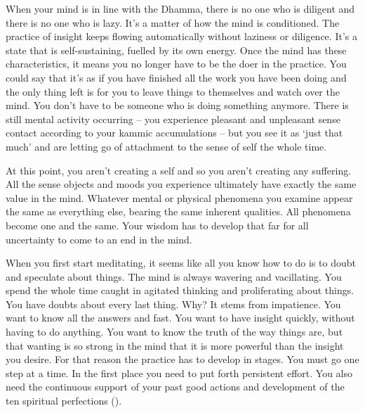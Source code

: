 When your mind is in line with the Dhamma, there is no one who is diligent and there is no one who is lazy. It's a matter of how the mind is conditioned. The practice of insight keeps flowing automatically without laziness or diligence. It's a state that is self-sustaining, fuelled by its own energy. Once the mind has these characteristics, it means you no longer have to be the doer in the practice. You could say that it's as if you have finished all the work you have been doing and the only thing left is for you to leave things to themselves and watch over the mind. You don't have to be someone who is doing something anymore. There is still mental activity occurring -- you experience pleasant and unpleasant sense contact according to your kammic accumulations -- but you see it as `just that much' and are letting go of attachment to the sense of self the whole time.

At this point, you aren't creating a self and so you aren't creating any suffering. All the sense objects and moods you experience ultimately have exactly the same value in the mind. Whatever mental or physical phenomena you examine appear the same as everything else, bearing the same inherent qualities. All phenomena become one and the same. Your wisdom has to develop that far for all uncertainty to come to an end in the mind.

When you first start meditating, it seems like all you know how to do is to doubt and speculate about things. The mind is always wavering and vacillating. You spend the whole time caught in agitated thinking and proliferating about things. You have doubts about every last thing. Why? It stems from impatience. You want to know all the answers and fast. You want to have insight quickly, without having to do anything. You want to know the truth of the way things are, but that wanting is so strong in the mind that it is more powerful than the insight you desire. For that reason the practice has to develop in stages. You must go one step at a time. In the first place you need to put forth persistent effort. You also need the continuous support of your past good actions and development of the ten spiritual perfections ().

